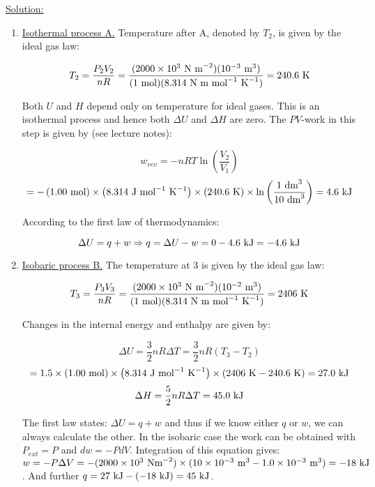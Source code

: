 \noindent
\underline{Solution:}\\

\begin{enumerate}

\item \underline{Isothermal process A.} Temperature after A, denoted by $T_2$, is given by the ideal gas law:

$$T_2 = \frac{P_2V_2}{nR} = \frac{(2000\times 10^3\textnormal{ N m}^{-2})(10^{-3}\textnormal{ m}^3)}{(1\textnormal{ mol})(8.314\textnormal{ N m mol}^{-1}\textnormal{ K}^{-1})} = 240.6\textnormal{ K}$$

Both $U$ and $H$ depend only on temperature for ideal gases. This is an isothermal process and hence both $\Delta U$ and $\Delta H$ are zero. The $PV$-work in this step is given by (see lecture notes):

$$w_{rev} = -nRT\ln\left(\frac{V_2}{V_1}\right)$$
$$ = -\left(1.00\textnormal{ mol}\right)\times\left(8.314\textnormal{ J mol}^{-1}\textnormal{ K}^{-1}\right)\times\left(240.6\textnormal{ K}\right)\times\ln\left(\frac{1\textnormal{ dm}^3}{10\textnormal{ dm}^3}\right) = 4.6\textnormal{ kJ}$$

According to the first law of thermodynamics:

$$\Delta U = q + w \Rightarrow q = \Delta U - w = 0 - 4.6\textnormal{ kJ} = -4.6\textnormal{ kJ}$$

\item \underline{Isobaric process B.} The temperature at 3 is given by the ideal gas law:

$$T_3 = \frac{P_3V_3}{nR} = \frac{(2000\times10^3\textnormal{ N m}^{-2})(10^{-2}\textnormal{ m}^3)}{(1\textnormal{ mol})(8.314\textnormal{ N m mol}^{-1}\textnormal{ K}^{-1})} = 2406\textnormal{ K}$$

Changes in the internal energy and enthalpy are given by:

$$\Delta U = \frac{3}{2}nR\Delta T = \frac{3}{2}nR\left(T_3 - T_2\right)$$
$$ = 1.5 \times (1.00\textnormal{ mol}) \times\left( 8.314\textnormal{ J mol}^{-1}\textnormal{ K}^{-1}\right) \times \left( 2406\textnormal{ K} - 240.6\textnormal{ K} \right) = 27.0\textnormal{ kJ}$$
$$\Delta H = \frac{5}{2}nR\Delta T = 45.0\textnormal{ kJ}$$

The first law states: $\Delta U = q + w$ and thus if we know either $q$ or $w$, we can always calculate the other. In the isobaric case the work can be obtained with $P_{ext} = P$ and $dw = -P dV$. Integration of this equation gives: $w = -P\Delta V = -(2000 \times 10^3\textnormal{ Nm}^{-2}) \times (10 \times 10^{-3}\textnormal{ m}^3 - 1.0 \times 10^{-3}\textnormal{ m}^3) = -18\textnormal{ kJ}$. And further $q = 27\textnormal{ kJ} - (-18\textnormal{ kJ}) = 45\textnormal{ kJ}$.


\end{enumerate}

